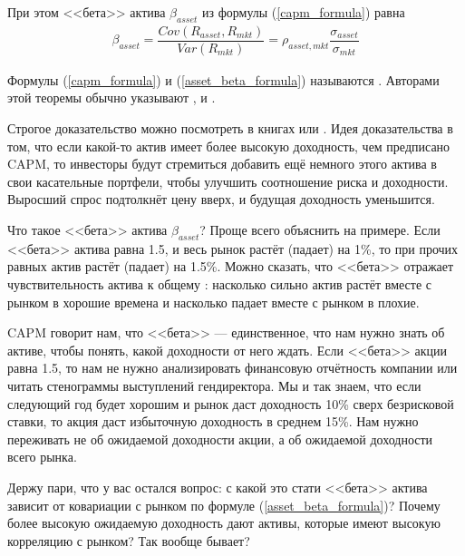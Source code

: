 При этом <<бета>> актива $\beta_{asset}$ из формулы (\ref{capm_formula}) равна
\begin{align}
\beta_{asset} = \dfrac{Cov(R_{asset}, R_{mkt})}{Var(R_{mkt})}
= \rho_{asset,mkt}\dfrac{\sigma_{asset}}{\sigma_{mkt}}
\label{asset_beta_formula}
\end{align}

Формулы (\ref{capm_formula}) и (\ref{asset_beta_formula}) называются 
. 
Авторами этой теоремы обычно указывают 
\cite{sharpe1964capital},  
\cite{lintner1965valuation} и  
\cite{mossin1966equilibrium}.

Строгое доказательство можно посмотреть в книгах \cite[ch.~9.1]
{cochrane2005asset} или \cite[ch.~9.1]{bodie2014investments}. Идея 
доказательства в том, что если какой-то актив имеет более высокую доходность, 
чем предписано CAPM, то инвесторы будут стремиться добавить ещё немного этого 
актива в свои касательные портфели, чтобы улучшить соотношение риска и 
доходности. Выросший спрос подтолкнёт цену вверх, и будущая доходность 
уменьшится.

Что такое <<бета>> актива $\beta_{asset}$? Проще всего объяснить на примере. 
Если <<бета>> актива равна 1.5, и весь рынок растёт (падает) на 1\%, то при 
прочих равных актив растёт (падает) на 1.5\%. Можно сказать, что <<бета>> 
отражает чувствительность актива к общему : 
насколько сильно актив растёт вместе с рынком в хорошие времена и насколько 
падает вместе с рынком в плохие.

CAPM говорит нам, что <<бета>> --- единственное, что нам нужно знать об активе, 
чтобы понять, какой доходности от него ждать. Если <<бета>> акции равна 1.5, то 
нам не нужно анализировать финансовую отчётность компании или читать стенограммы 
выступлений гендиректора. Мы и так знаем, что если следующий год будет хорошим и 
рынок даст доходность 10\% сверх безрисковой ставки, то акция даст избыточную 
доходность в среднем 15\%. Нам нужно переживать не об ожидаемой доходности 
акции, а об ожидаемой доходности всего рынка.

Держу пари, что у вас остался вопрос: с какой это стати <<бета>> актива зависит 
от ковариации с рынком по формуле (\ref{asset_beta_formula})? Почему более 
высокую ожидаемую доходность дают активы, которые имеют высокую корреляцию с 
рынком? Так вообще бывает?

